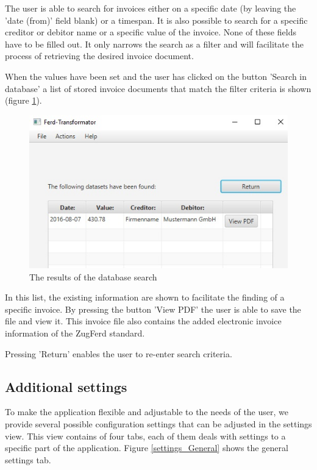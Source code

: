 The user is able to search for invoices either on a specific date (by leaving the 'date (from)' field blank) or a timespan.
It is also possible to search for a specific creditor or debitor name or a specific value of the invoice.
None of these fields have to be filled out. It only narrows the search as a filter and will facilitate the process of retrieving the desired invoice document.

When the values have been set and the user has clicked on the button 'Search in database' a list of stored invoice documents that match the filter criteria is shown (figure \ref{searchResults}).

\begin{figure}[ht!]
\centering
\includegraphics[width=\textwidth]{Images/GUI/SearchResults.jpg}
\caption{The results of the database search \label{searchResults}}
\end{figure}

In this list, the existing information are shown to facilitate the finding of a specific invoice. By pressing the button 'View PDF' the user is able to save the file and view it. This invoice file also contains the added electronic invoice information of the ZugFerd standard.

Pressing 'Return' enables the user to re-enter search criteria. 

\subsection{Additional settings}
\label{sec5.7.3}

To make the application flexible and adjustable to the needs of the user, we provide several possible configuration settings that can be adjusted in the settings view. This view contains of four tabs, each of them deals with settings to a specific part of the application.
Figure \ref{settings_General} shows the general settings tab. 

